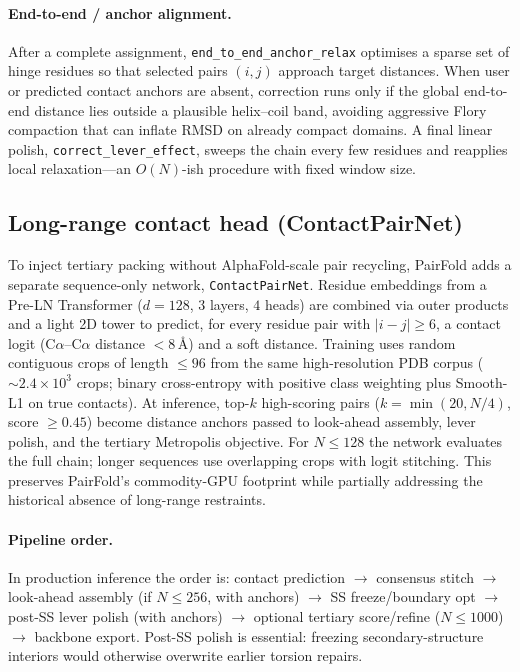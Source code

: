 \documentclass[11pt,a4paper]{article}
\begin{document}
\paragraph{End-to-end / anchor alignment.}
After a complete assignment, \texttt{end\_to\_end\_anchor\_relax} optimises a sparse set of hinge residues so that selected pairs $(i,j)$ approach target distances.
When user or predicted contact anchors are absent, correction runs only if the global end-to-end distance lies outside a plausible helix--coil band, avoiding aggressive Flory compaction that can inflate RMSD on already compact domains.
A final linear polish, \texttt{correct\_lever\_effect}, sweeps the chain every few residues and reapplies local relaxation---an $O(N)$-ish procedure with fixed window size.

\subsection{Long-range contact head (ContactPairNet)}
\label{sec:contacts}

To inject tertiary packing without AlphaFold-scale pair recycling, PairFold adds a separate sequence-only network, \texttt{ContactPairNet}.
Residue embeddings from a Pre-LN Transformer ($d{=}128$, $3$ layers, $4$ heads) are combined via outer products and a light 2D tower to predict, for every residue pair with $|i{-}j|\ge 6$, a contact logit (C$\alpha$--C$\alpha$ distance ${<}8$\,\AA) and a soft distance.
Training uses random contiguous crops of length $\le 96$ from the same high-resolution PDB corpus ($\sim 2.4{\times}10^{3}$ crops; binary cross-entropy with positive class weighting plus Smooth-L1 on true contacts).
At inference, top-$k$ high-scoring pairs ($k{=}\min(20,N/4)$, score $\ge 0.45$) become distance anchors passed to look-ahead assembly, lever polish, and the tertiary Metropolis objective.
For $N\le 128$ the network evaluates the full chain; longer sequences use overlapping crops with logit stitching.
This preserves PairFold's commodity-GPU footprint while partially addressing the historical absence of long-range restraints.

\paragraph{Pipeline order.}
In production inference the order is:
contact prediction $\rightarrow$ consensus stitch $\rightarrow$ look-ahead assembly (if $N\le 256$, with anchors) $\rightarrow$ SS freeze/boundary opt $\rightarrow$ post-SS lever polish (with anchors) $\rightarrow$ optional tertiary score/refine ($N\le 1000$) $\rightarrow$ backbone export.
Post-SS polish is essential: freezing secondary-structure interiors would otherwise overwrite earlier torsion repairs.
\end{document}
